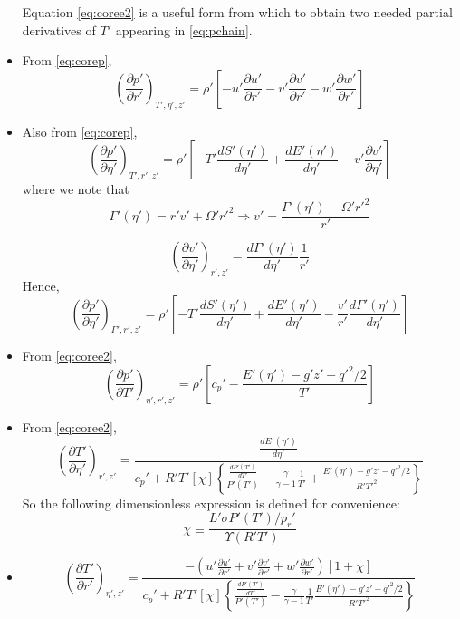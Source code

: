 \documentclass[preprint, prX]{revtex4}
\newcommand{\dd}[2]{\frac{d#1}{d#2}}
\newcommand{\pd}[2]{\frac{\partial#1}{\partial#2}}
\newcommand{\tpd}[3]{\left( \frac{\partial#1}{\partial#2} \right)_{#3}}
\newcommand{\gogmo}{\frac{\gamma}{\gamma-1}}
\begin{document}
\begin{itemize}
Equation \eqref{eq:coree2} is a useful form from which to obtain two needed partial derivatives of $T'$ appearing in \eqref{eq:pchain}.

\item 
From \eqref{eq:corep},
\begin{equation}
\tpd{p'}{r'}{T', \eta', z'} = \rho' \left[ -u' \pd{u'}{r'} - v'\pd{v'}{r'} - w'\pd{w'}{r'} \right]
\end{equation}

\item
Also from \eqref{eq:corep},
\begin{equation}
\tpd{p'}{\eta'}{T', r', z'} = \rho' \left[ -T' \dd{S'(\eta')}{\eta'} + \dd{E'(\eta')}{\eta'} - v' \pd{v'}{\eta'} \right]
\end{equation}
where we note that
\begin{equation}
\Gamma'(\eta') = r'v' + \Omega'r'^2 \Rightarrow v' = \frac{\Gamma'(\eta') - \Omega'r'^2}{r'}
\end{equation}

\begin{equation}
\tpd{v'}{\eta'}{r',z'} = \dd{\Gamma'(\eta')}{\eta'}\frac{1}{r'} \end{equation}
Hence,
\begin{equation}
\tpd{p'}{\eta'}{\Gamma',r',z'} = \rho' \left[ -T' \dd{S'(\eta')}{\eta'} + \dd{E'(\eta')}{\eta'} - \frac{v'}{r'} \dd{\Gamma'(\eta')}{\eta'} \right] 
\end{equation}

\item
From \eqref{eq:coree2},
\begin{equation}
\tpd{p'}{T'}{\eta', r', z'} = \rho' \left[ c_p'- \frac{E'(\eta') -g'z' - q'^2/2}{T'} \right]
\end{equation}

\item
From \eqref{eq:coree2},
\begin{equation}
\tpd{T'}{\eta'}{r',z'} = \frac{\dd{E'(\eta')}{\eta'	}}{c_p' + R'T'[\chi]\left\{ \frac{\dd{P'(T')}{T'}}{P'(T')} - \gogmo \frac{1}{T'} + \frac{E'(\eta') - g'z'-q'^2/2}{R'T'^2}\right\} }
\end{equation}
So the following dimensionless expression is defined for convenience: 
\begin{equation}
\chi \equiv \frac{L'\sigma P'(T')/p_r'}{\Upsilon(R' T')} 
\end{equation}

\item
\begin{equation}
\tpd{T'}{r'}{\eta',z'} = \frac{-\left( u'\pd{u'}{r'} + v' \pd{v'}{r'} + w'\pd{w'}{r'}\right)\left[ 1 + \chi\right]}{c_p' + R'T'[\chi] \left\{ \frac{\dd{P'(T')}{T'}}{P'(T')} - \gogmo \frac{1}{T'} \frac{E'(\eta') - g'z'-q'^2/2}{R'T'^2}  \right\}}
\end{equation}


\end{itemize}
\end{document}

